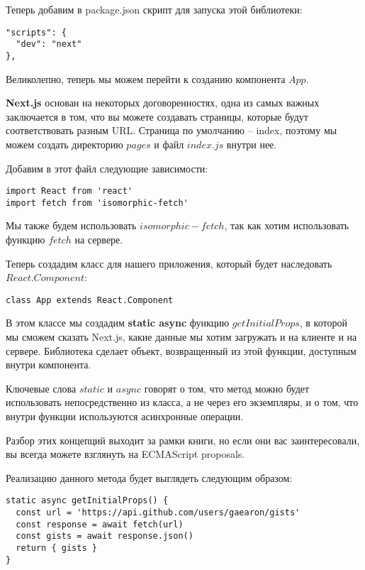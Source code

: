 Теперь добавим в package.json скрипт для запуска этой библиотеки:

\begin{lstlisting}
"scripts": {
  "dev": "next"
},
\end{lstlisting}

Великолепно, теперь мы можем перейти к созданию компонента $App$.

\textbf{Next.js} основан на некоторых договоренностях, одна из самых важных заключается в том, что вы можете создавать страницы, которые будут соответствовать разным URL. Страница по умолчанию -- index, поэтому мы можем создать директорию $pages$ и файл $index.js$ внутри нее.

Добавим в этот файл следующие зависимости:

\begin{lstlisting}
import React from 'react'
import fetch from 'isomorphic-fetch'
\end{lstlisting}

Мы также будем использовать $isomorphic-fetch$, так как хотим использовать функцию $fetch$ на сервере.

Теперь создадим класс для нашего приложения, который будет наследовать $React.Component$:

\begin{lstlisting}
class App extends React.Component
\end{lstlisting}

В этом классе мы создадим \textbf{static async} функцию $getInitialProps$, в которой мы сможем сказать Next.js, какие данные мы хотим загружать и на клиенте и на сервере. Библиотека сделает объект, возвращенный из этой функции, доступным внутри компонента.

Ключевые слова $static$ и $async$ говорят о том, что метод можно будет использовать непосредственно из класса, а не через его экземпляры, и о том, что внутри функции используются асинхронные операции.

Разбор этих концепций выходит за рамки книги, но если они вас заинтересовали, вы всегда можете взглянуть на ECMAScript proposals.

Реализацию данного метода будет выглядеть следующим образом:

\begin{lstlisting}
static async getInitialProps() {
  const url = 'https://api.github.com/users/gaearon/gists'
  const response = await fetch(url)
  const gists = await response.json()
  return { gists }
}
\end{lstlisting}

